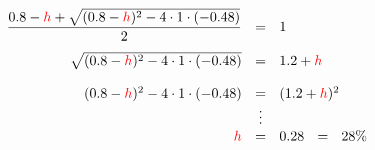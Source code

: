\begin{frame}
\begin{itemize}
		\vspace{1mm}
		\[
		\begin{array}{@{\hspace{0.2\tabcolsep}}r@{\hspace{1.6\tabcolsep}}c@{\hspace{1.6\tabcolsep}}l@{\hspace{0.2\tabcolsep}}}
			\dfrac{0.8-{\color{red}h} + \sqrt{( 0.8-{\color{red}h} )^2 - 4\cdot 1\cdot (-0.48) }}{2} & = & 1 \\[4mm]
			                     \sqrt{( 0.8-{\color{red}h} )^2 - 4\cdot 1\cdot (-0.48) } & = & 1.2+{\color{red}h} \\[4mm]
			                     ( 0.8-{\color{red}h} )^2 - 4\cdot 1\cdot (-0.48)  & = & (1.2+{\color{red}h})^2 \\[0mm]	
			                     	                                               & \vdots & \\[0mm]
			                     	                                {\color{red}h} & = & 0.28 \ \ = \ \ 28\%
		\end{array}
		\]
	\end{itemize}
	
\end{frame}


\subsection{}

